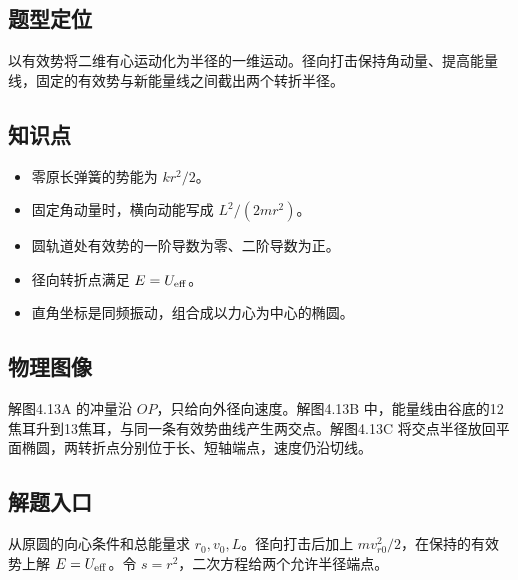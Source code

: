 \documentclass[UTF8,fontset=fandol,a4paper,11pt]{ctexart}
\begin{document}


\subsection*{题型定位}

以有效势将二维有心运动化为半径的一维运动。径向打击保持角动量、提高能量线，固定的有效势与新能量线之间截出两个转折半径。



\subsection*{知识点}

\begin{itemize}
\item 零原长弹簧的势能为 $kr^2/2$。
\item 固定角动量时，横向动能写成 $L^2/(2mr^2)$。
\item 圆轨道处有效势的一阶导数为零、二阶导数为正。
\item 径向转折点满足 $E=U_{\rm eff}$。
\item 直角坐标是同频振动，组合成以力心为中心的椭圆。
\end{itemize}




\subsection*{物理图像}

解图4.13A 的冲量沿 $OP$，只给向外径向速度。解图4.13B 中，能量线由谷底的12焦耳升到13焦耳，与同一条有效势曲线产生两交点。解图4.13C 将交点半径放回平面椭圆，两转折点分别位于长、短轴端点，速度仍沿切线。



\subsection*{解题入口}

从原圆的向心条件和总能量求 $r_0,v_0,L$。径向打击后加上 $mv_{r0}^2/2$，在保持的有效势上解 $E=U_{\rm eff}$。令 $s=r^2$，二次方程给两个允许半径端点。
\end{document}
